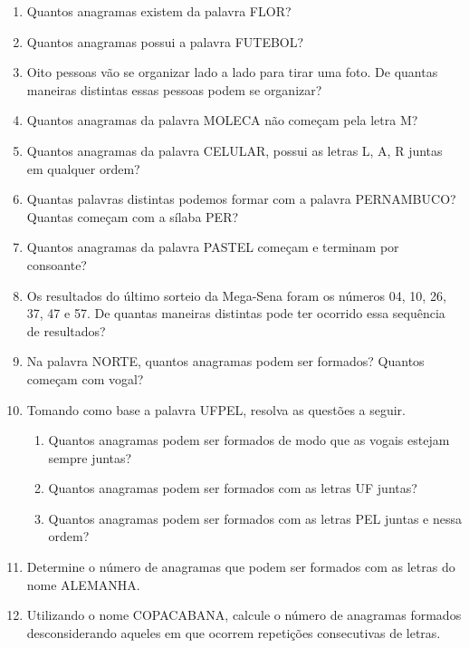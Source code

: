 \documentclass[twocolumn,oneside,a4paper,12pt]{article}
\begin{document}
\pagestyle{empty}
\cabecalho

\begin{enumerate}
\item Quantos anagramas existem da palavra FLOR?

\item Quantos anagramas possui a palavra FUTEBOL?

\item Oito pessoas vão se organizar lado a lado para tirar uma foto. De quantas maneiras distintas essas pessoas podem se organizar?

\item Quantos anagramas da palavra MOLECA não começam pela letra M?

\item Quantos anagramas da palavra CELULAR, possui as letras L, A, R juntas em qualquer ordem?

\item  Quantas palavras distintas podemos formar com a palavra PERNAMBUCO? Quantas começam com a sílaba PER?

\item Quantos anagramas da palavra PASTEL começam e terminam por consoante?

\item Os resultados do último sorteio da Mega-Sena foram os números 04, 10, 26, 37, 47 e 57. De quantas maneiras distintas pode ter ocorrido essa sequência de resultados?

\item Na palavra NORTE, quantos anagramas podem ser formados? Quantos começam com vogal?

\item Tomando como base a palavra UFPEL, resolva as questões a seguir.
\begin{enumerate}
    \item Quantos anagramas podem ser formados de modo que as vogais estejam sempre juntas?
    \item Quantos anagramas podem ser formados com as letras UF juntas?
    \item Quantos anagramas podem ser formados com as letras PEL juntas e nessa ordem?
\end{enumerate}

\item Determine o número de anagramas que podem ser formados com as letras do nome ALEMANHA.

\item Utilizando o nome COPACABANA, calcule o número de anagramas formados desconsiderando aqueles em que ocorrem repetições consecutivas de letras.


\end{enumerate}
\end{document}
